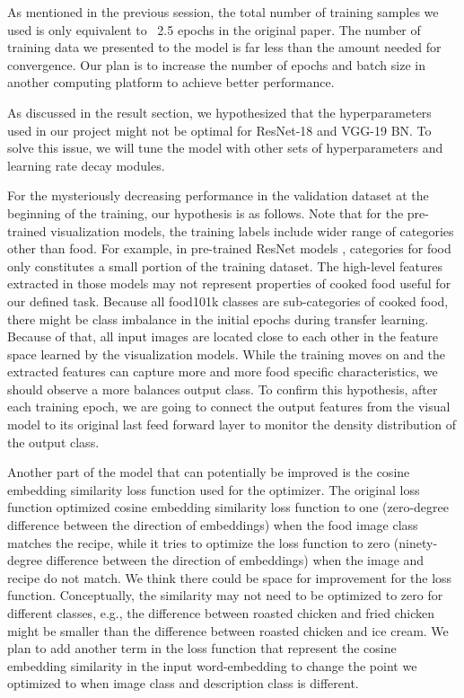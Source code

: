 \documentclass[10pt,twocolumn,letterpaper]{article}
\begin{document}
As mentioned in the previous session, the total number of training samples we used is only equivalent to ~2.5 epochs in the original paper. The number of training data we presented to the model is far less than the amount needed for convergence. Our plan is to increase the number of epochs and batch size in another computing platform to achieve better performance.

As discussed in the result section, we hypothesized that the hyperparameters used in our project might not be optimal for ResNet-18 and VGG-19 BN.  To solve this issue, we will tune the model with other sets of hyperparameters and learning rate decay modules. 

For the mysteriously decreasing performance in the validation dataset at the beginning of the training, our hypothesis is as follows. Note that for the pre-trained visualization models, the training labels include wider range of categories other than food. For example, in pre-trained ResNet models \cite{he2015deep}, categories for food only constitutes a small portion of the training dataset. The high-level features extracted in those models may not represent properties of cooked food useful for our defined task. Because all food101k classes are sub-categories of cooked food, there might be class imbalance in the initial epochs during transfer learning.   Because of that, all input images are located close to each other in the feature space learned by the visualization models. While the training moves on and the extracted features can capture more and more food specific characteristics, we should observe a more balances output class. To confirm this hypothesis, after each training epoch, we are going to connect the output features from the visual model to its original last feed forward layer to monitor the density distribution of the output class.

Another part of the model that can potentially be improved is the cosine embedding similarity loss function used for the optimizer. The original loss function optimized cosine embedding similarity loss function to one (zero-degree difference between the direction of embeddings) when the food image class matches the recipe, while it tries to optimize the loss function to zero (ninety-degree difference between the direction of embeddings) when the image and recipe do not match.  We think there could be space for improvement for the loss function.  Conceptually, the similarity may not need to be optimized to zero for different classes, e.g., the difference between roasted chicken and fried chicken might be smaller than the difference between roasted chicken and ice cream. We plan to add another term in the loss function that represent the cosine embedding similarity in the input word-embedding to change the point we optimized to when image class and description class is different.
\end{document}
